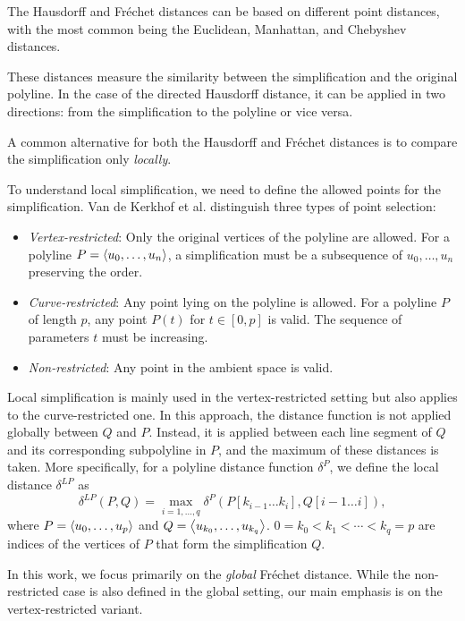 The Hausdorff and Fréchet distances can be based on different point distances, with the most common being the Euclidean, Manhattan, and Chebyshev distances.

These distances measure the similarity between the simplification and the original polyline. In the case of the directed Hausdorff distance, it can be applied in two directions: from the simplification to the polyline or vice versa.

A common alternative for both the Hausdorff and Fréchet distances is to compare the simplification only \emph{locally}.

To understand local simplification, we need to define the allowed points for the simplification. Van de Kerkhof et al. distinguish three types of point selection:
\begin{itemize}
  \item \emph{Vertex-restricted}: Only the original vertices of the polyline are allowed. For a polyline \(P = \left\langle u_0, \dots, u_n\right\rangle\), a simplification must be a subsequence of \(u_0, \dots, u_n\) preserving the order.
	\item \emph{Curve-restricted}: Any point lying on the polyline is allowed. For a polyline \(P\) of length \(p\), any point \(P(t)\) for \(t \in [0, p]\) is valid. The sequence of parameters \(t\) must be increasing.
	\item \emph{Non-restricted}: Any point in the ambient space is valid.
\end{itemize}

Local simplification is mainly used in the vertex-restricted setting but also applies to the curve-restricted one. In this approach, the distance function is not applied globally between \(Q\) and \(P\). Instead, it is applied between each line segment of \(Q\) and its corresponding subpolyline in \(P\), and the maximum of these distances is taken. More specifically, for a polyline distance function \(\delta^P\), we define the local distance \(\delta^{LP}\) as
\[\delta^{LP}(P, Q) = \max_{i = 1, \dots, q} \delta^P(P[k_{i-1}\dots k_i], Q[i-1 \dots i]),\]
where \(P = \left\langle u_0, \dots, u_p\right\rangle\) and \(Q = \left\langle u_{k_0}, \dots, u_{k_q}\right\rangle\). \(0 = k_0 < k_1 < \cdots < k_q = p\) are indices of the vertices of \(P\) that form the simplification \(Q\).

In this work, we focus primarily on the \emph{global} Fréchet distance. While the non-restricted case is also defined in the global setting, our main emphasis is on the vertex-restricted variant.

